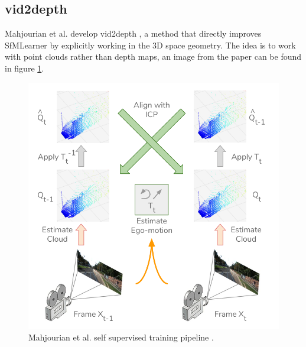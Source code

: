 \subsection{vid2depth}
Mahjourian et al. develop vid2depth \cite{vid2depth}, a method that directly improves SfMLearner by explicitly working in the 3D space geometry.
The idea is to work with point clouds rather than depth maps, an image from the paper can be found in figure \ref{fig:vid2depth}.

\begin{figure}
	\centering
	\includegraphics[scale=0.3]{figs/vid2depth}
	\caption{Mahjourian et al. self supervised training pipeline \cite{vid2depth}. \label{fig:vid2depth}}
\end{figure}

